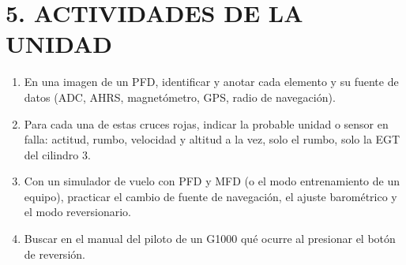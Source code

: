 \section*{5. ACTIVIDADES DE LA UNIDAD}
\begin{enumerate}
  \item En una imagen de un PFD, identificar y anotar cada elemento y su fuente de datos (ADC,
        AHRS, magnetómetro, GPS, radio de navegación).
  \item Para cada una de estas cruces rojas, indicar la probable unidad o sensor en falla:
        actitud, rumbo, velocidad y altitud a la vez, solo el rumbo, solo la EGT del cilindro 3.
  \item Con un simulador de vuelo con PFD y MFD (o el modo entrenamiento de un equipo), practicar
        el cambio de fuente de navegación, el ajuste barométrico y el modo reversionario.
  \item Buscar en el manual del piloto de un G1000 qué ocurre al presionar el botón de reversión.
\end{enumerate}
